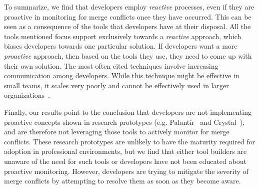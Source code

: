 To summarize, we find that developers employ \emph{reactive} processes, even if they are proactive in monitoring for merge conflicts once they have occurred.
This can be seen as a consequence of the tools that developers have at their disposal.
All the tools mentioned focus support exclusively towards a \emph{reactive} approach, which biases developers towards one particular solution.
If developers want a more \emph{proactive} approach, then based on the tools they use, they need to come up with their own solution.
The most often cited techniques involve increasing communication among developers.
While this technique might be effective in small teams, it scales very poorly and cannot be effectively used in larger organizations~\cite{brooks1974mythical}.

Finally, our results point to the conclusion that developers are not implementing proactive concepts shown in research prototypes (e.g. Palant\'{i}r~\cite{sarma_palantir:_2003} and Crystal~\cite{Brun2011}), and are therefore not leveraging those tools to actively monitor for merge conflicts.
These research prototypes are unlikely to have the maturity required for adoption in professional environments, but we find that either tool builders are unaware of the need for such tools or developers have not been educated about proactive monitoring.
However, developers are trying to mitigate the severity of merge conflicts by attempting to resolve them as soon as they become aware.\vspace{1.5em}
